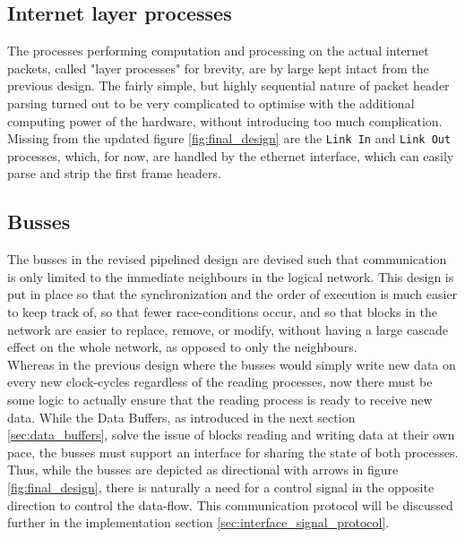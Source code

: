 \subsection{Internet layer processes} \label{sec:layer_processes}
The processes performing computation and processing on the actual internet
packets, called "layer processes" for brevity, are by large kept intact from the
previous design. The fairly simple, but highly sequential nature of packet
header parsing turned out to be very complicated to optimise with the additional
computing power of the hardware, without introducing too much complication.\\
Missing from the updated figure \ref{fig:final_design} are the \texttt{Link In}
and \texttt{Link Out} processes, which, for now, are handled by the ethernet
interface, which can easily parse and strip the first frame headers.


\subsection{Busses}
The busses in the revised pipelined design are devised such that communication
is only limited to the immediate neighbours in the logical network. This design
is put in place so that the synchronization and the order of execution is much
easier to keep track of, so that fewer race-conditions occur, and so that blocks
in the network are easier to replace, remove, or modify, without having a large
cascade effect on the whole network, as opposed to only the neighbours.\\
Whereas in the previous design where the busses would simply write new data on
every new clock-cycles regardless of the reading processes, now there must be
some logic to actually ensure that the reading process is ready to receive new
data. While the Data Buffers, as introduced in the next section \ref{sec:data_buffers},
solve the issue of blocks reading and writing data at their own pace, the busses
must support an interface for sharing the state of both processes. Thus, while
the busses are depicted as directional with arrows in figure \ref{fig:final_design},
there is naturally a need for a control signal in the opposite direction to
control the data-flow. This communication protocol will be discussed further in
the implementation section \ref{sec:interface_signal_protocol}.



